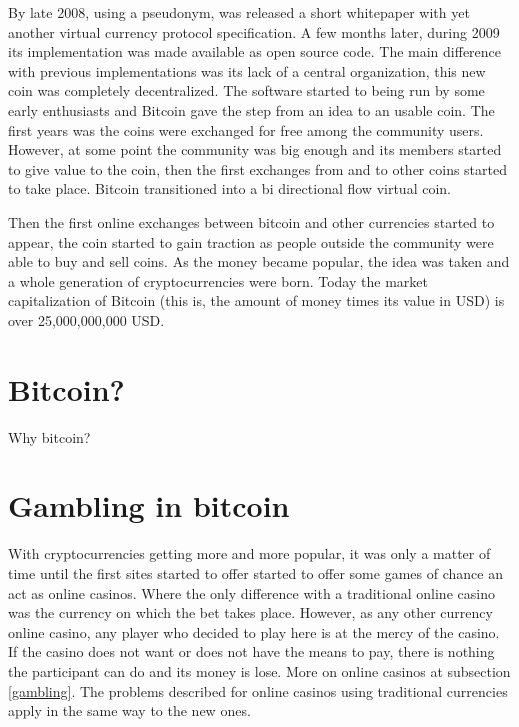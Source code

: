\begin{intro}
By late 2008, using a pseudonym, was released a short
  whitepaper\cite{nakamoto2008bitcoin} with yet another virtual currency
  protocol specification. A few months later, during 2009 its implementation
  was made available as open source code. The main difference with previous
  implementations was its lack of a central organization, this new coin was
  completely decentralized. The software started to being run by some early
  enthusiasts and Bitcoin gave the step from an idea to an usable coin. The
  first years was the coins were exchanged for free among the community users.
  However, at some point the community was big enough and its members started
  to give value to the coin, then the first exchanges from and to other coins
  started to take place. Bitcoin transitioned into a bi directional flow
  virtual coin.

Then the first online exchanges between bitcoin and other currencies started
  to appear, the coin started to gain traction as people outside the community
  were able to buy and sell coins. As the money became popular, the idea was
  taken and a whole generation of cryptocurrencies were born. Today the
  market capitalization of Bitcoin (this is, the amount of money times its
  value in USD) is over 25,000,000,000 USD.
  
\section{Bitcoin?}

Why bitcoin?
  
\section{Gambling in bitcoin}

With cryptocurrencies getting more and more popular, it was only a matter of
  time until the first sites started to offer started to offer some games of
  chance an act as online casinos. Where the only difference with a traditional
  online casino was the currency on which the bet takes place.
However, as any other currency online casino, any player who decided to play
  here is at the mercy of the casino. If the casino does not want or does not
  have the means to pay, there is nothing the participant can do and its money
  is lose. More on online casinos at subsection \ref{gambling}. The problems
  described for online casinos using traditional currencies apply in the same
  way to the new ones.
  

\end{intro}
